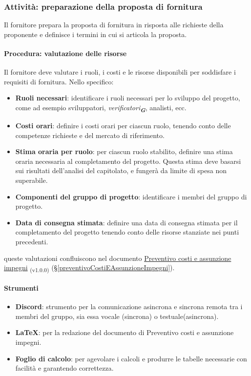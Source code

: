 \documentclass[a4paper,12pt]{article}
\newcommand{\glossario}[1]{\textit{#1}\textsubscript{\textbf{\textit{\textcolor{lightblack}{G}}}}}
\newcommand{\ped}[1]{\textsubscript{#1}}
\begin{document}
\subsubsection{Attività: preparazione della proposta di fornitura}\label{preparazionePropostaFornitura}
Il fornitore prepara la proposta di fornitura in risposta alle richieste della
proponente e definisce i termini in cui si articola la proposta.

\paragraph{Procedura: valutazione delle risorse}
Il fornitore deve valutare i ruoli, i costi e le risorse disponibili per
soddisfare i requisiti di fornitura. Nello specifico:
\begin{itemize}
    \item \textbf{Ruoli necessari}: identificare i ruoli necessari per lo sviluppo del progetto, come ad esempio sviluppatori, \glossario{verificatori}, analisti, ecc.
    \item \textbf{Costi orari}: definire i costi orari per ciascun ruolo, tenendo conto delle competenze richieste e del mercato di riferimento.
    \item \textbf{Stima oraria per ruolo}: per ciascun ruolo stabilito, definire una stima oraria necessaria al completamento del progetto. Questa stima deve basarsi sui risultati dell'analisi del capitolato, e fungerà da limite di spesa non superabile.
    \item \textbf{Componenti del gruppo di progetto}: identificare i membri del gruppo di progetto.
    \item \textbf{Data di consegna stimata}: definire una data di consegna stimata per il completamento del progetto tenendo conto delle risorse stanziate nei punti precedenti.
\end{itemize}
queste valutazioni confluiscono nel documento \href{https://7-zpus.github.io/Docs/assets/1_Candidatura/PreventivoCostiEAssunzioneImpegni.pdf}{Preventivo costi e assunzione impegni} \ped{(v1.0.0)} (§\ref{preventivoCostiEAssunzioneImpegni}).
\paragraph{Strumenti}
\begin{itemize}
    \item \textbf{Discord}: strumento per la comunicazione asincrona e sincrona remota tra i membri del gruppo, sia essa vocale (sincrona) o testuale(asincrona).
    \item \textbf{\LaTeX}: per la redazione del documento di Preventivo costi e assunzione impegni.
    \item \textbf{Foglio di calcolo}: per agevolare i calcoli e produrre le tabelle necessarie con facilità e garantendo correttezza.
\end{itemize}
\end{document}
